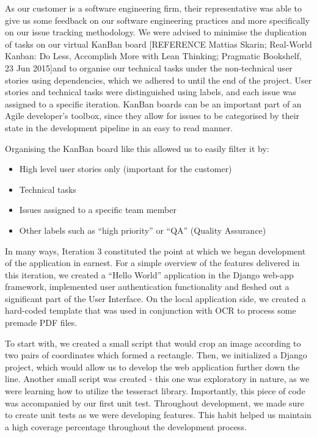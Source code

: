 \documentclass{l3proj}
\begin{document}
As our customer is a software engineering firm, their representative was able to give us some feedback on our software engineering practices and more specifically on our issue tracking methodology. We were advised to minimise the duplication of tasks on our virtual KanBan board [REFERENCE Mattias Skarin; Real-World Kanban: Do Less, Accomplish More with Lean Thinking; Pragmatic Bookshelf, 23 Jun 2015]and to organise our technical tasks under the non-technical user stories using dependencies, which we adhered to until the end of the project. User stories and technical tasks were distinguished using labels, and each issue was assigned to a specific iteration. KanBan boards can be an important part of an Agile developer’s toolbox, since they allow for issues to be categorised by their state in the development pipeline in an easy to read manner.

Organising the KanBan board like this allowed us to easily filter it by:
\begin{itemize}
\item High level user stories only (important for the customer)
\item Technical tasks
\item Issues assigned to a specific team member
\item Other labels such as ``high priority'' or ``QA'' (Quality Assurance)
\end{itemize}

In many ways, Iteration 3 constituted the point at which we began development of the application in earnest. For a simple overview of the features delivered in this iteration, we created a ``Hello World'' application in the Django web-app framework, implemented user authentication functionality and fleshed out a significant part of the User Interface. On the local application side, we created a hard-coded template that was used in conjunction with OCR to process some premade PDF files.

To start with, we created a small script that would crop an image according to two pairs of coordinates which formed a rectangle. Then, we initialized a Django project, which would allow us to develop the web application further down the line. Another small script was created - this one was exploratory in nature, as we were learning how to utilize the tesseract library. Importantly, this piece of code was accompanied by our first unit test. Throughout development, we made sure to create unit tests as we were developing features. This habit helped us maintain a high coverage percentage throughout the development process.
\end{document}
